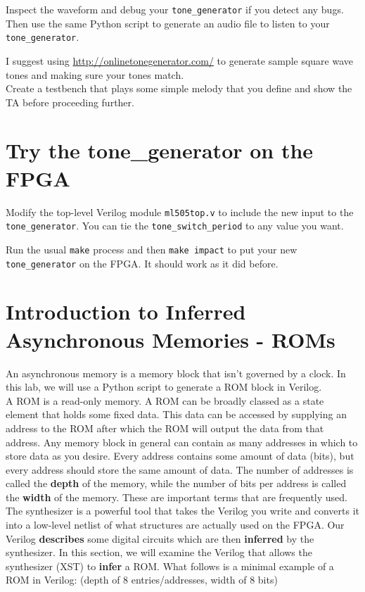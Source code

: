 \documentclass[11pt]{article}
\begin{document}
Inspect the waveform and debug your \verb|tone_generator| if you detect any bugs. Then use the same Python script to generate an audio file to listen to your \verb|tone_generator|.

I suggest using \url{http://onlinetonegenerator.com/} to generate sample square wave tones and making sure your tones match.\\

Create a testbench that plays some simple melody that you define and show the TA before proceeding further.

\section{Try the tone\_generator on the FPGA}
Modify the top-level Verilog module \verb|ml505top.v| to include the new input to the \verb|tone_generator|. You can tie the \verb|tone_switch_period| to any value you want.

Run the usual \verb|make| process and then \verb|make impact| to put your new \verb|tone_generator| on the FPGA. It should work as it did before.

\section{Introduction to Inferred Asynchronous Memories - ROMs}
An asynchronous memory is a memory block that isn't governed by a clock. In this lab, we will use a Python script to generate a ROM block in Verilog.\\

A ROM is a read-only memory. A ROM can be broadly classed as a state element that holds some fixed data. This data can be accessed by supplying an address to the ROM after which the ROM will output the data from that address. Any memory block in general can contain as many addresses in which to store data as you desire. Every address contains some amount of data (bits), but every address should store the same amount of data. The number of addresses is called the \textbf{depth} of the memory, while the number of bits per address is called the \textbf{width} of the memory. These are important terms that are frequently used. \\

The synthesizer is a powerful tool that takes the Verilog you write and converts it into a low-level netlist of what structures are actually used on the FPGA. Our Verilog \textbf{describes} some digital circuits which are then \textbf{inferred} by the synthesizer. In this section, we will examine the Verilog that allows the synthesizer (XST) to \textbf{infer} a ROM. What follows is a minimal example of a ROM in Verilog: (depth of 8 entries/addresses, width of 8 bits)
\end{document}
